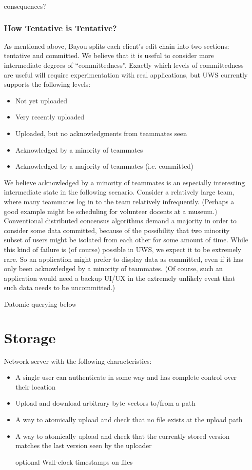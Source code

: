 \documentclass{article}
\begin{document}
consequences?

\subsubsection{How Tentative is Tentative?}

As mentioned above, Bayou splits each client's edit chain into two sections: tentative and committed.
We believe that it is useful to consider more intermediate degrees of ``committedness''.
Exactly which levels of committedness are useful will require experimentation with real applications, but UWS currently supports the following levels:

\begin{itemize}
\item Not yet uploaded
\item Very recently uploaded
\item Uploaded, but no acknowledgments from teammates seen
\item Acknowledged by a minority of teammates
\item Acknowledged by a majority of teammates (i.e. committed)
\end{itemize}

We believe acknowledged by a minority of teammates is an especially interesting intermediate state in the following scenario.
Consider a relatively large team, where many teammates log in to the team relatively infrequently.
(Perhaps a good example might be scheduling for volunteer docents at a museum.)
Conventional distributed concensus algorithms demand a majority in order to consider some data committed, because of the possibility that two minority subset of users might be isolated from each other for some amount of time.
While this kind of failure is (of course) possible in UWS, we expect it to be extremely rare.
So an application might prefer to display data as committed, even if it has only been acknowledged by a minority of teammates.
(Of course, such an application would need a backup UI/UX in the extremely unlikely event that such data needs to be uncommitted.)

Datomic querying below

\section{Storage}

Network server with the following characteristics:

\begin{itemize}
\item A single user can authenticate in some way and has complete control over their location
\item Upload and download arbitrary byte vectors to/from a path
\item A way to atomically upload and check that no file exists at the upload path
\item A way to atomically upload and check that the currently stored version matches the last version seen by the uploader
\item [optional] Wall-clock timestamps on files
\end{itemize}
\end{document}
